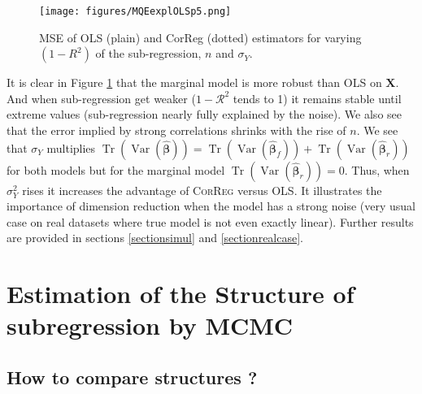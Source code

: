 \documentclass[11pt,a4paper]{report}
\begin{document}
\begin{figure}[h!]
	\texttt{[image: figures/MQEexplOLSp5.png]}\label{MQE1}
	\caption{MSE of OLS (plain) and CorReg (dotted) estimators for varying $(1-R^2)$ of the sub-regression, $n$ and $\sigma_Y$.}
\end{figure} 
It is clear in Figure \ref{MQE1} that the marginal model is more robust than \textsc{OLS} on $\boldsymbol{X}$. And when sub-regression get weaker ($1-\mathcal{R}^2$ tends to 1) it remains stable until extreme values (sub-regression nearly fully explained by the noise). We also see that the error implied by strong correlations shrinks with the rise of $n$. 
We see that $\sigma_Y$ multiplies $\operatorname{Tr}(\operatorname{Var}(\hat{\boldsymbol{\beta}}))=\operatorname{Tr}(\operatorname{Var}(\hat{\boldsymbol{\beta}}_{f}))+\operatorname{Tr}(\operatorname{Var}(\hat{\boldsymbol{\beta}}_{r}))$ for both models but for the marginal model $\operatorname{Tr}(\operatorname{Var}(\hat{\boldsymbol{\beta}}_{r}))=0$.
 Thus, when $\sigma_Y^2$ rises it increases the advantage of \textsc{CorReg} versus \textsc{OLS}. It illustrates the importance of dimension reduction when the model has a strong noise (very usual case on real datasets where true model is not even exactly linear). Further results are provided in sections \ref{sectionsimul} and \ref{sectionrealcase}.

	
\chapter{Estimation of the Structure of subregression by MCMC}
	\section{How to compare structures ?}
\end{document}

